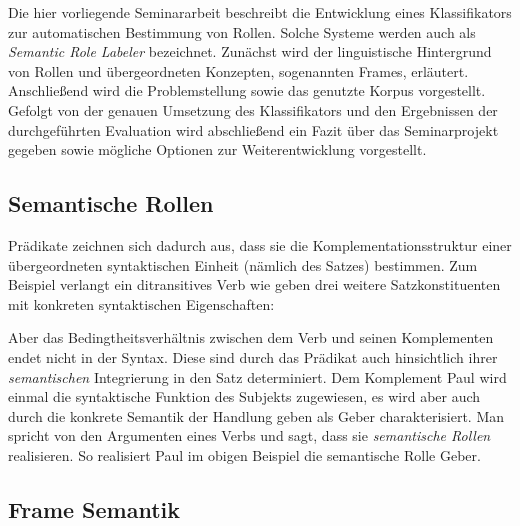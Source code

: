 \documentclass[12pt]{article}
\begin{document}
Die hier vorliegende Seminararbeit beschreibt die Entwicklung eines Klassifikators zur automatischen Bestimmung von Rollen. Solche Systeme werden auch als \textit{Semantic Role Labeler} bezeichnet.  Zunächst wird der linguistische Hintergrund von Rollen und übergeordneten Konzepten, sogenannten Frames, erläutert. Anschließend wird die Problemstellung sowie das genutzte Korpus vorgestellt. Gefolgt von der genauen Umsetzung des Klassifikators und den Ergebnissen der durchgeführten Evaluation wird abschließend ein Fazit über das Seminarprojekt gegeben sowie mögliche Optionen zur Weiterentwicklung vorgestellt. 

\subsection{Semantische Rollen}

Prädikate zeichnen sich dadurch aus, dass sie die Komplementationsstruktur einer
übergeordneten syntaktischen Einheit (nämlich des Satzes) bestimmen. Zum
Beispiel verlangt ein ditransitives Verb wie \glqq{}geben\grqq{} drei weitere Satzkonstituenten mit konkreten syntaktischen Eigenschaften:

\begin{center}
\end{center}

Aber das Bedingtheitsverhältnis zwischen dem Verb und seinen Komplementen 
endet nicht in der Syntax. Diese sind durch das Prädikat auch hinsichtlich ihrer 
\textit{semantischen} Integrierung in den Satz determiniert. Dem Komplement \glqq{}Paul\grqq{}
wird einmal die syntaktische Funktion des Subjekts zugewiesen, es wird aber auch
durch die konkrete Semantik der Handlung \glqq{}geben\grqq{} als 
\glqq{}Geber\grqq{} charakterisiert. Man spricht von den Argumenten
eines Verbs und sagt, dass sie \textit{semantische Rollen} realisieren. So realisiert \glqq{}Paul\grqq{} im obigen Beispiel die semantische Rolle \glqq{}Geber\grqq{}.

\subsection{Frame Semantik}
\end{document}

